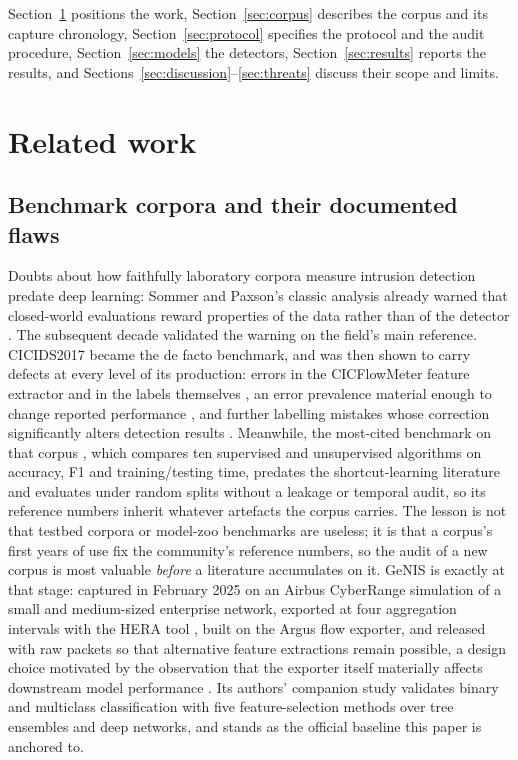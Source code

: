 \documentclass[review,12pt]{elsarticle}
\begin{document}
Section~\ref{sec:related} positions the work, Section~\ref{sec:corpus} describes the
corpus and its capture chronology, Section~\ref{sec:protocol} specifies the protocol and
the audit procedure, Section~\ref{sec:models} the detectors,
Section~\ref{sec:results} reports the results, and
Sections~\ref{sec:discussion}--\ref{sec:threats} discuss their scope and limits.

\section{Related work}
\label{sec:related}

\subsection{Benchmark corpora and their documented flaws}
Doubts about how faithfully laboratory corpora measure intrusion detection
predate deep learning: Sommer and Paxson's classic analysis already warned
that closed-world evaluations reward properties of the data rather than of
the detector \cite{sommer2010closed}. The subsequent decade validated the
warning on the field's main reference. CICIDS2017 \cite{sharafaldin2018cicids} became the de facto benchmark, and was then shown to carry defects at
every level of its production: errors in the CICFlowMeter feature extractor
and in the labels themselves \cite{engelen2021troubleshooting}, an error
prevalence material enough to change reported performance
\cite{liu2022error}, and further labelling mistakes whose correction
significantly alters detection results \cite{lanvin2022errors}. Meanwhile, the
most-cited benchmark on that corpus \cite{maseer2021benchmarking}, which
compares ten supervised and unsupervised algorithms on accuracy, F1 and
training/testing time, predates the shortcut-learning literature and
evaluates under random splits without a leakage or temporal audit, so its
reference numbers inherit whatever artefacts the corpus carries. The lesson
is not that testbed corpora or model-zoo benchmarks are useless; it is that
a corpus's first years of use fix the community's reference numbers, so the
audit of a new corpus is most valuable \emph{before} a literature
accumulates on it. GeNIS
\cite{silva2025genis} is exactly at that stage: captured in February 2025 on
an Airbus CyberRange simulation of a small and medium-sized enterprise
network, exported at four aggregation intervals with the HERA tool
\cite{pinto2024hera}, built on the Argus flow exporter, and released with
raw packets so that alternative feature extractions remain possible, a
design choice motivated by the observation that the exporter itself
materially affects downstream model performance \cite{pinto2025exporter}.
Its authors' companion study \cite{silva2025binary} validates binary and
multiclass classification with five feature-selection methods over tree
ensembles and deep networks, and stands as the official baseline this paper
is anchored to.
\end{document}
